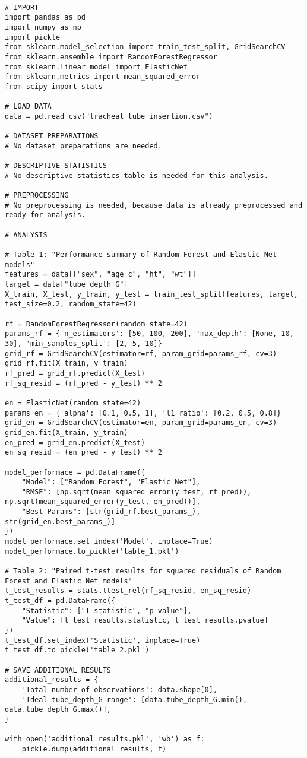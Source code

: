 \documentclass[11pt]{article}
\begin{document}
\begin{verbatim}

# IMPORT
import pandas as pd
import numpy as np
import pickle
from sklearn.model_selection import train_test_split, GridSearchCV
from sklearn.ensemble import RandomForestRegressor
from sklearn.linear_model import ElasticNet
from sklearn.metrics import mean_squared_error
from scipy import stats

# LOAD DATA
data = pd.read_csv("tracheal_tube_insertion.csv")

# DATASET PREPARATIONS
# No dataset preparations are needed.

# DESCRIPTIVE STATISTICS
# No descriptive statistics table is needed for this analysis.

# PREPROCESSING 
# No preprocessing is needed, because data is already preprocessed and ready for analysis.

# ANALYSIS

# Table 1: "Performance summary of Random Forest and Elastic Net models"
features = data[["sex", "age_c", "ht", "wt"]]
target = data["tube_depth_G"]
X_train, X_test, y_train, y_test = train_test_split(features, target, test_size=0.2, random_state=42)

rf = RandomForestRegressor(random_state=42)
params_rf = {'n_estimators': [50, 100, 200], 'max_depth': [None, 10, 30], 'min_samples_split': [2, 5, 10]}
grid_rf = GridSearchCV(estimator=rf, param_grid=params_rf, cv=3)
grid_rf.fit(X_train, y_train)
rf_pred = grid_rf.predict(X_test)
rf_sq_resid = (rf_pred - y_test) ** 2

en = ElasticNet(random_state=42)
params_en = {'alpha': [0.1, 0.5, 1], 'l1_ratio': [0.2, 0.5, 0.8]}
grid_en = GridSearchCV(estimator=en, param_grid=params_en, cv=3)
grid_en.fit(X_train, y_train)
en_pred = grid_en.predict(X_test)
en_sq_resid = (en_pred - y_test) ** 2

model_performace = pd.DataFrame({
    "Model": ["Random Forest", "Elastic Net"],
    "RMSE": [np.sqrt(mean_squared_error(y_test, rf_pred)), np.sqrt(mean_squared_error(y_test, en_pred))],
    "Best Params": [str(grid_rf.best_params_), str(grid_en.best_params_)]
})
model_performace.set_index('Model', inplace=True)
model_performace.to_pickle('table_1.pkl')

# Table 2: "Paired t-test results for squared residuals of Random Forest and Elastic Net models"
t_test_results = stats.ttest_rel(rf_sq_resid, en_sq_resid)
t_test_df = pd.DataFrame({
    "Statistic": ["T-statistic", "p-value"],
    "Value": [t_test_results.statistic, t_test_results.pvalue]
})
t_test_df.set_index('Statistic', inplace=True)
t_test_df.to_pickle('table_2.pkl')

# SAVE ADDITIONAL RESULTS
additional_results = {
    'Total number of observations': data.shape[0], 
    'Ideal tube_depth_G range': [data.tube_depth_G.min(), data.tube_depth_G.max()],
}

with open('additional_results.pkl', 'wb') as f:
    pickle.dump(additional_results, f)

\end{verbatim}
\end{document}
